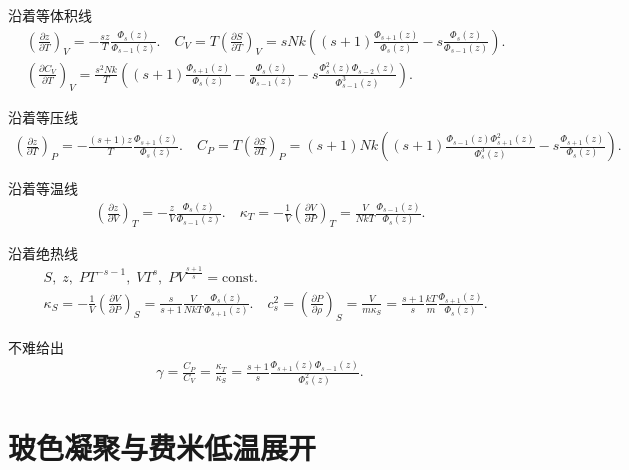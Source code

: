 沿着等体积线
\begin{align*}
	&\left( \frac{\partial z}{\partial T} \right)_{V} = -\frac{s z}{T} \frac{\Phi_{s}(z)}{\Phi_{s-1}(z)}. \quad C_{V} = T \left( \frac{\partial S}{\partial T} \right)_{V} = s N k \left( (s+1) \frac{\Phi_{s+1}(z)}{\Phi_{s}(z)} - s \frac{\Phi_{s}(z)}{\Phi_{s-1}(z)} \right). \\
	&\left( \frac{\partial C_{V}}{\partial T} \right)_{V} = \frac{s^{2} N k}{T} \left( (s+1) \frac{\Phi_{s+1}(z)}{\Phi_{s}(z)} - \frac{\Phi_{s}(z)}{\Phi_{s-1}(z)} - s \frac{\Phi_{s}^{2}(z) \Phi_{s-2}(z)}{\Phi_{s-1}^{3}(z)} \right).
\end{align*}

沿着等压线
\begin{align*}
	\left( \frac{\partial z}{\partial T} \right)_{P} = -\frac{(s+1) z}{T} \frac{\Phi_{s+1}(z)}{\Phi_{s}(z)}. \quad C_{P} = T \left( \frac{\partial S}{\partial T} \right)_{P} = (s+1) N k \left( (s+1) \frac{\Phi_{s-1}(z) \Phi_{s+1}^{2}(z)}{\Phi_{s}^{3}(z)} - s \frac{\Phi_{s+1}(z)}{\Phi_{s}(z)} \right).
\end{align*}

沿着等温线
\begin{align*}
	\left( \frac{\partial z}{\partial V} \right)_{T} = -\frac{z}{V} \frac{\Phi_{s}(z)}{\Phi_{s-1}(z)}. \quad
	\kappa_{T} = -\frac{1}{V} \left( \frac{\partial V}{\partial P} \right)_{T} = \frac{V}{N k T} \frac{\Phi_{s-1}(z)}{\Phi_{s}(z)}.
\end{align*}

沿着绝热线
\begin{align*}
	&S, \; z, \; P T^{-s-1}, \; V T^{s}, \; P V^{\frac{s+1}{s}} = \text{const}.\\
	&\kappa_{S} = -\frac{1}{V} \left( \frac{\partial V}{\partial P} \right)_{S} = \frac{s}{s+1} \frac{V}{N k T} \frac{\Phi_{s}(z)}{\Phi_{s+1}(z)}. \quad
	c_{s}^{2} = \left( \frac{\partial P}{\partial \rho} \right)_{S} = \frac{V}{m \kappa_{S}} = \frac{s+1}{s} \frac{k T}{m} \frac{\Phi_{s+1}(z)}{\Phi_{s}(z)}.
\end{align*}

不难给出
\begin{align*}
	\gamma = \frac{C_{P}}{C_{V}} = \frac{\kappa_{T}}{\kappa_{S}} = \frac{s+1}{s} \frac{\Phi_{s+1}(z) \Phi_{s-1}(z)}{\Phi_{s}^{2}(z)}.
\end{align*}

\section{玻色凝聚与费米低温展开}

